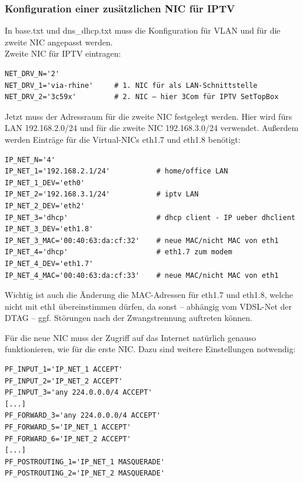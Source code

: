 \subsubsection{Konfiguration einer zusätzlichen NIC für IPTV}

In base.txt und dns\_dhcp.txt muss die Konfiguration für VLAN und für die zweite
NIC angepasst werden.\\

\noindent Zweite NIC für IPTV eintragen:\\

\begin{example}
\begin{verbatim}
NET_DRV_N='2'
NET_DRV_1='via-rhine'     # 1. NIC für als LAN-Schnittstelle
NET_DRV_2='3c59x'         # 2. NIC – hier 3Com für IPTV SetTopBox
\end{verbatim}
\end{example}

Jetzt muss der Adressraum für die zweite NIC festgelegt werden. Hier wird fürs
LAN 192.168.2.0/24 und für die zweite NIC 192.168.3.0/24 verwendet. Außerdem
werden Einträge für die Virtual-NICs eth1.7 und eth1.8 benötigt:\\

\begin{example}
\begin{verbatim}
IP_NET_N='4'
IP_NET_1='192.168.2.1/24'           # home/office LAN
IP_NET_1_DEV='eth0'
IP_NET_2='192.168.3.1/24'           # iptv LAN
IP_NET_2_DEV='eth2'
IP_NET_3='dhcp'                     # dhcp client - IP ueber dhclient
IP_NET_3_DEV='eth1.8'
IP_NET_3_MAC='00:40:63:da:cf:32'    # neue MAC/nicht MAC von eth1
IP_NET_4='dhcp'                     # eth1.7 zum modem
IP_NET_4_DEV='eth1.7'
IP_NET_4_MAC='00:40:63:da:cf:33'    # neue MAC/nicht MAC von eth1
\end{verbatim}
\end{example}

Wichtig ist auch die Änderung die MAC-Adressen für eth1.7 und eth1.8, welche
nicht mit eth1 übereinstimmen dürfen, da sonst – abhängig vom VDSL-Net der DTAG
– ggf. Störungen nach der Zwangstrennung auftreten können.

Für die neue NIC muss der Zugriff auf das Internet natürlich genauso
funktionieren, wie für die erste NIC. Dazu sind weitere Einstellungen
notwendig:\\

\begin{example}
\begin{verbatim}
PF_INPUT_1='IP_NET_1 ACCEPT'
PF_INPUT_2='IP_NET_2 ACCEPT'
PF_INPUT_3='any 224.0.0.0/4 ACCEPT'
[...]
PF_FORWARD_3='any 224.0.0.0/4 ACCEPT'
PF_FORWARD_5='IP_NET_1 ACCEPT'
PF_FORWARD_6='IP_NET_2 ACCEPT'
[...]
PF_POSTROUTING_1='IP_NET_1 MASQUERADE'
PF_POSTROUTING_2='IP_NET_2 MASQUERADE'
\end{verbatim}
\end{example}

